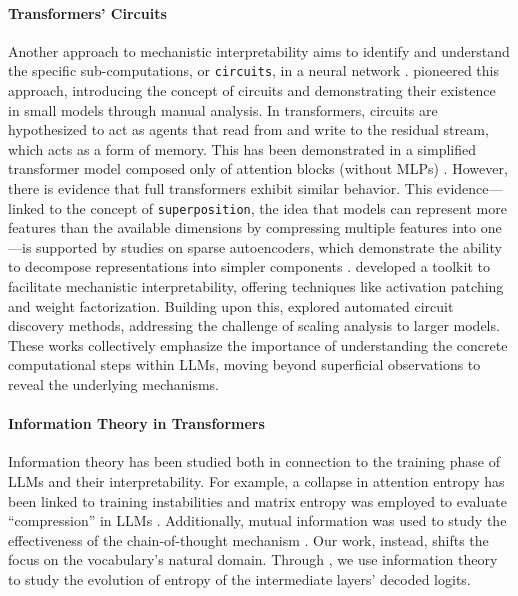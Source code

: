 \paragraph{Transformers' Circuits}
Another approach to mechanistic interpretability aims to identify and understand the specific sub-computations, or \texttt{circuits}, in a neural network \citep{saphra2024mechanistic}. \cite{olah2020zoom} pioneered this approach, introducing the concept of circuits and demonstrating their existence in small models through manual analysis. In transformers, circuits are hypothesized to act as agents that read from and write to the residual stream, which acts as a form of memory. This has been demonstrated in a simplified transformer model composed only of attention blocks (without MLPs) \citep{elhage2021mathematical}. However, there is evidence that full transformers exhibit similar behavior. This evidence—linked to the concept of \texttt{superposition}, the idea that models can represent more features than the available dimensions by compressing multiple features into one \citep{elhage2022superposition}—is supported by studies on sparse autoencoders, which demonstrate the ability to decompose representations into simpler components \citep{bricken2023monosemanticity}. \citet{conmy2023towards} developed a toolkit to facilitate mechanistic interpretability, offering techniques like activation patching and weight factorization. Building upon this, \cite{conmy2023automatedcircuit} explored automated circuit discovery methods, addressing the challenge of scaling analysis to larger models. These works collectively emphasize the importance of understanding the concrete computational steps within LLMs, moving beyond superficial observations to reveal the underlying mechanisms.

\paragraph{Information Theory in Transformers} Information theory has been studied both in connection to the training phase of LLMs and their interpretability. For example, a collapse in attention entropy has been linked to training instabilities \citep{10.5555/3618408.3620117} and matrix entropy was employed to evaluate ``compression'' in LLMs \citep{wei2024differanknovelrankbasedmetric}. Additionally, mutual information was used to study the effectiveness of the chain-of-thought mechanism \citep{ton2024understandingchainofthoughtllmsinformation}. Our work, instead, shifts the focus on the vocabulary's natural domain. Through \entropylens, we use information theory to study the evolution of entropy of the intermediate layers' decoded logits.


